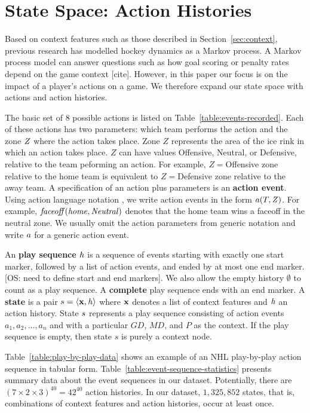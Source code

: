 \documentclass[]{article}
\begin{document}
\section{State Space: Action Histories}

Based on context features such as those described in Section~\ref{sec:context}, previous research has modelled hockey dynamics as a Markov process. A Markov process model can answer questions such as how goal scoring or penalty rates depend on the game context [cite]. However, in this paper our focus is on the impact of a player's actions on a game. We therefore expand our state space with actions and action histories. 

The basic set of 8 possible actions is listed on Table~\ref{table:events-recorded}. Each of these actions has two parameters: which team performs the action and the zone $\it{Z}$ where the action takes place. Zone $Z$ represents the area of the ice rink in which an action takes place. $Z$ can have values Offensive, Neutral, or Defensive, relative to the team peforming an action. For example, $Z=$Offensive zone relative to the home team is equivalent to $Z=$Defensive zone relative to the away team. A specification of an action plus parameters is an \textbf{action event}. Using action language notation \cite{bib:LevesquePirriReiter98}, we write action events in the form $a(T,\it{Z})$. For example, $\it{faceoff}(\it{home},\it{Neutral})$ denotes that the home team wins a faceoff in the neutral zone. We usually omit the action parameters from generic notation and write $a$ for a generic action event.

An \textbf{play sequence} $\it{h}$ is a sequence of events starting with exactly one start marker, followed by a list of action events, and ended by at most one end marker.  [OS: need to define start and end markers]. We also allow the empty history $\emptyset$ to count as a play sequence. A \textbf{complete} play sequence ends with an end marker. 
A \textbf{state} is a pair $s = \langle \mathbf{x}, \it{h} \rangle$ where $\mathbf{x}$ denotes a list of context features and $\it{h}$ an action history. State $s$ represents a play sequence consisting of action events $a_1,a_2,\ldots,a_n$ and with a particular $GD$, $MD$, and $P$ as the context. If the play sequence is empty, then state $s$ is purely a context node. 

Table~\ref{table:play-by-play-data} shows an example of an NHL play-by-play action sequence in tabular form. Table~\ref{table:event-sequence-statistics} presents summary data about the event sequences in our dataset. Potentially, there are $(7 \times 2 \times 3)^{40} = 42^{40}$ action histories. In our dataset, $1,325,852$ states, that is, combinations of context features and action histories, occur at least once. 
\end{document}
